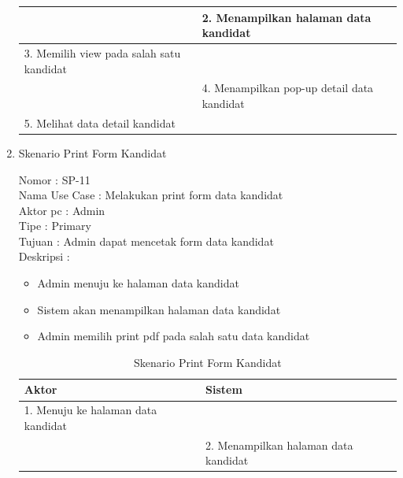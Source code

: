 \begin{enumerate}
\begin{table}
\begin{tabular}{ |  p{73mm} | p{55mm} |}
		\hline
		
		&  2.	Menampilkan halaman data kandidat \\
		
		\hline
		
		3. Memilih view pada salah satu kandidat & \\
		
		\hline
		
		& 4.	Menampilkan pop-up detail data kandidat \\
		
		\hline
		
		5. Melihat data detail kandidat  & \\
		\hline
		
		
	\end{tabular}
\end{table}

\item Skenario Print Form Kandidat

Nomor \kern 3.6pc : SP-11 \\
Nama Use Case : Melakukan print form data kandidat \\
Aktor  pc : Admin \\
Tipe \kern 4.6pc : Primary \\
Tujuan \kern 3.6pc : Admin dapat mencetak form data kandidat \\
Deskripsi \kern 2.5pc : 

\begin{itemize}
	\item Admin menuju ke halaman data kandidat
	\item Sistem akan menampilkan halaman data kandidat
	\item Admin memilih print pdf pada salah satu data kandidat
	
\end{itemize}

\begin{table}
	\caption{Skenario Print Form Kandidat}
	\centering
	\begin{tabular}{ | p{61.5mm} | p{67mm} |}
		\hline 
		\textbf{Aktor} & \textbf{Sistem} \\
		\hline
		
		1.	Menuju ke halaman data kandidat &  \\
		
		\hline
		
		&  2.	Menampilkan halaman data kandidat \\
		
		\hline
		

\end{tabular}
\end{table}
\end{enumerate}
